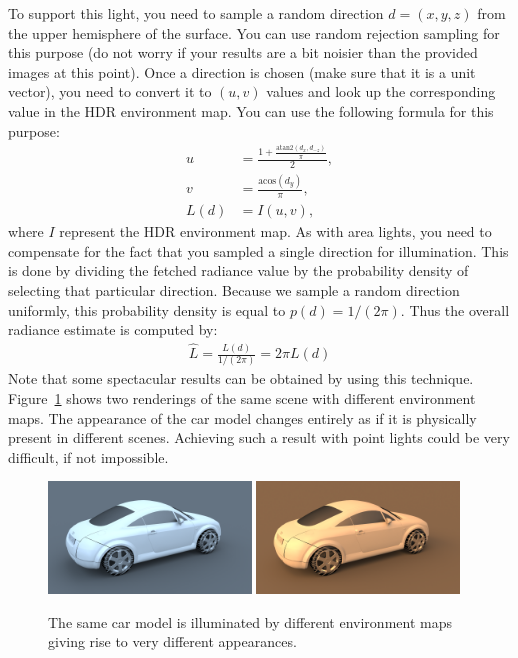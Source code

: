 \documentclass[12pt]{article}
\begin{document}
To support this light, you need to sample a random direction $d = (x, y, z)$ from the
upper hemisphere of the surface. You can use random rejection sampling
for this purpose (do not worry if your results are a bit noisier than
the provided images at this point). Once a direction is chosen (make
sure that it is a unit vector), you need to convert it to $(u,v)$
values and look up the corresponding value in the HDR environment map. 
You can use the following formula for this purpose:
%
\begin{align}
u &= \frac{1 + \frac{\textrm{atan2}(d_x, d_{-z})}{\pi}}{2}, \\
v &= \frac{\textrm{acos}(d_y)}{\pi}, \\
L(d) &= I(u, v),
\end{align}
%
where $I$ represent the HDR environment map.
As with area lights, you need to compensate for the fact that you
sampled a single direction for illumination. This is done by dividing
the fetched radiance value by the probability density of selecting that
particular direction. Because we sample a random direction uniformly,
this probability density is equal to $p(d) = 1/(2\pi)$. Thus the
overall radiance estimate is computed by:
%
\begin{align}
\hat{L} = \frac{L(d)}{1/(2\pi)} = 2\pi L(d)
\end{align}
%
Note that some spectacular results can be obtained by using this
technique. Figure~\ref{FigAudi} shows two renderings of the same
scene with different environment maps. The appearance of the car model
changes entirely as if it is physically present in different scenes.
Achieving such a result with point lights could be very difficult, if
not impossible.

\begin{figure}
\centerline{
    \includegraphics[width=0.48\textwidth]{img/audi-tt-glacier-1600.png}
    \includegraphics[width=0.48\textwidth]{img/audi-tt-pisa-1600.png}
}
\caption{The same car model is illuminated by different environment
    maps giving rise to very different appearances.}
\label{FigAudi}
\end{figure}
\end{document}
